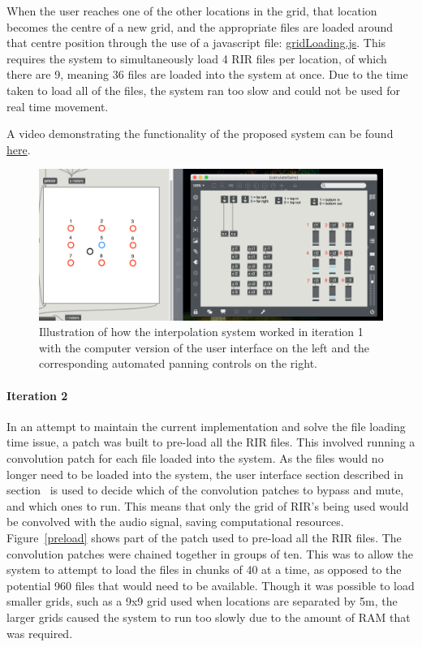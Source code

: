 \documentclass[../../main.tex]{subfiles}
\begin{document}
		 	When the user reaches one of the other locations in the grid, that location becomes the centre of a new grid, and the appropriate files are loaded around that centre position through the use of a javascript file: \href{http://lt669.github.io/code/javascript/html/gridLoading.html}{gridLoading.js}. This requires the system to simultaneously load 4 \ac{RIR} files per location, of which there are 9, meaning 36 files are loaded into the system at once. Due to the time taken to load all of the files, the system ran too slow and could not be used for real time movement.

		 	A video demonstrating the functionality of the proposed system can be found \href{http://lt669.github.io/pages/videos.html}{here}.

			\begin{figure}
				\centerline{\includegraphics[width=\textwidth]{Sections/Implementation/Max/images/Max/iteration1/panning_edit2.png}}
				\caption{Illustration of how the interpolation system worked in iteration 1 with the computer version of the user interface on the left and the corresponding automated panning controls on the right.}
				\label{iteration1Panning}
			\end{figure}


		 \paragraph{Iteration 2}

		 	In an attempt to maintain the current implementation and solve the file loading time issue, a patch was built to pre-load all the \ac{RIR} files. This involved running a convolution patch for each file loaded into the system. As the files would no longer need to be loaded into the system, the user interface section described in section~ is used to decide which of the convolution patches to bypass and mute, and which ones to run. This means that only the grid of \ac{RIR}'s being used would be convolved with the audio signal, saving computational resources. Figure~\ref{preload} shows part of the patch used to pre-load all the \ac{RIR} files. The convolution patches were chained together in groups of ten. This was to allow the system to attempt to load the files in chunks of 40 at a time, as opposed to the potential 960 files that would need to be available. Though it was possible to load smaller grids, such as a 9x9 grid used when locations are separated by 5m, the larger grids caused the system to run too slowly due to the amount of RAM that was required.
\end{document}
